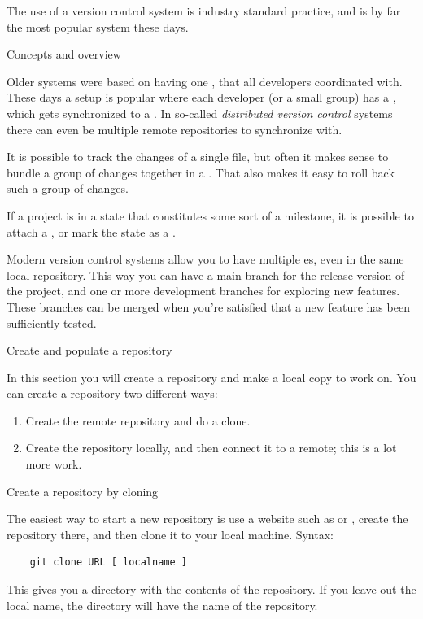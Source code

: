 The use of a version control system is industry standard practice,
and  is by far the most popular system these days.

 {Concepts and overview}

Older systems were based on having one ,
that all developers coordinated with.
These days a setup is popular where each developer (or a small group)
has a ,
which gets synchronized to a .
In so-called \emph{distributed version control}
systems there can even be multiple remote repositories to synchronize with.

It is possible to track the changes of a single file,
but often it makes sense to bundle a group of changes
together in a .
That also makes it easy to roll back such a group of changes.

If a project is in a state that constitutes some sort of a milestone,
it is possible to attach a ,
or mark the state as a .

Modern version control systems allow you to have
multiple es,
even in the same local repository.
This way you can have a main branch for the release version of the project,
and one or more development branches for exploring new features.
These branches can be merged when you're satisfied that a new feature has been
sufficiently tested.

{} {Create and populate a repository}
\lstset{style=gitsession}

In this section you will create a repository and make a local copy
to work on.
%
You can create a repository two different ways:
\begin{enumerate}
\item Create the remote repository and do a clone.
\item Create the repository locally, and then connect it to a remote;
  this is a lot more work.
\end{enumerate}

 {Create a repository by cloning}

The easiest way to start a new repository is use a website such as
 or ,
create the repository there, and then clone it to your local machine.
Syntax:
\begin{lstlisting}
    git clone URL [ localname ]
\end{lstlisting}
This gives you a directory with the contents of the repository.
If you leave out the local name, the directory will have the name
of the repository.

